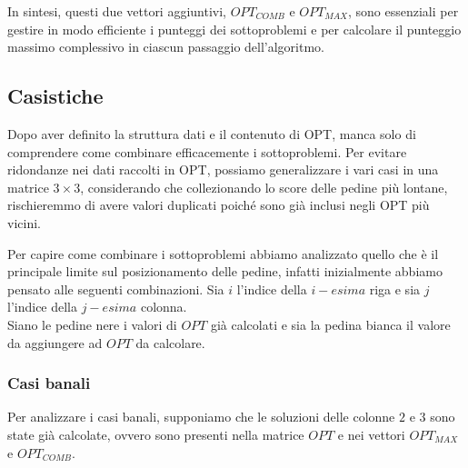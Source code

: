 In sintesi, questi due vettori aggiuntivi, $OPT_{COMB}$ e $OPT_{MAX}$, sono essenziali per gestire in modo efficiente i punteggi dei 
sottoproblemi e per calcolare il punteggio massimo complessivo in ciascun passaggio dell'algoritmo.

\subsection{Casistiche}


Dopo aver definito la struttura dati e il contenuto di OPT, manca solo di comprendere come combinare efficacemente i sottoproblemi. 
Per evitare ridondanze nei dati raccolti in OPT, possiamo generalizzare i vari casi in una matrice $3 \times 3$, considerando che 
collezionando lo score delle pedine più lontane, rischieremmo di avere valori duplicati poiché sono già inclusi negli OPT più vicini.

Per capire come combinare i sottoproblemi abbiamo analizzato quello che è il principale limite sul posizionamento delle pedine, 
infatti inizialmente abbiamo pensato alle seguenti combinazioni.
\newline
Sia $i$ l'indice della $i-esima$ riga e sia $j$ l'indice della $j-esima$ colonna.\\
Siano le pedine nere i valori di $OPT$ già calcolati e sia la pedina bianca il valore da aggiungere ad $OPT$ da calcolare.

\subsubsection*{Casi banali}

Per analizzare i casi banali, supponiamo che le soluzioni delle colonne $2$ e $3$ sono state già calcolate, ovvero sono presenti nella matrice $OPT$ e nei vettori $OPT_{MAX}$ e $OPT_{COMB}$.

